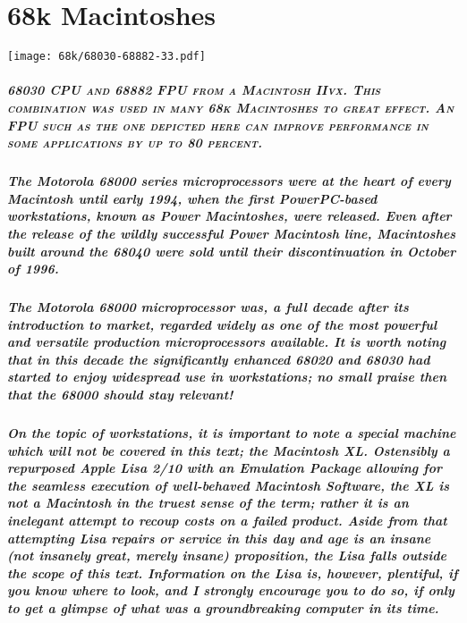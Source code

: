
\chapter{68k Macintoshes}

\begin{center}
\texttt{[image: 68k/68030-68882-33.pdf]} \\
\end{center}

\paragraph{\scriptsize{\textsc{%
68030 CPU and 68882 FPU from a Macintosh IIvx. This combination %
was used in many 68k Macintoshes to great effect. An FPU such as %
the one depicted here can improve performance in some applications %
by up to 80 percent.}}}

\paragraph{%
The Motorola 68000 series microprocessors were at the heart of every Macintosh %
until early 1994, when the first PowerPC-based workstations, known as Power %
Macintoshes, were released. Even after the release of the wildly successful %
Power Macintosh line, Macintoshes built around the 68040 were sold until %
their discontinuation in October of 1996. %
}

\paragraph{%
The Motorola 68000 microprocessor was, a full decade after its introduction to %
market, regarded widely as one of the most powerful and versatile production %
microprocessors available. It is worth noting that in this decade the %
significantly enhanced 68020 and 68030 had started to enjoy widespread use %
in workstations; no small praise then that the 68000 should stay relevant! %
}

\paragraph{%
On the topic of workstations, it is important to note a special machine which %
will not be covered in this text; the Macintosh XL. Ostensibly a repurposed %
Apple Lisa 2/10 with an Emulation Package allowing for the seamless execution %
of well-behaved Macintosh Software, the XL is not a Macintosh in the truest %
sense of the term; rather it is an inelegant attempt to recoup costs on a %
failed product. Aside from that attempting Lisa repairs or service in this %
day and age is an insane (not insanely great, merely insane) proposition, the %
Lisa falls outside the scope of this text. Information on the Lisa is, however, %
plentiful, if you know where to look, and I strongly encourage you to do so, if %
only to get a glimpse of what was a groundbreaking computer in its time. %
}

